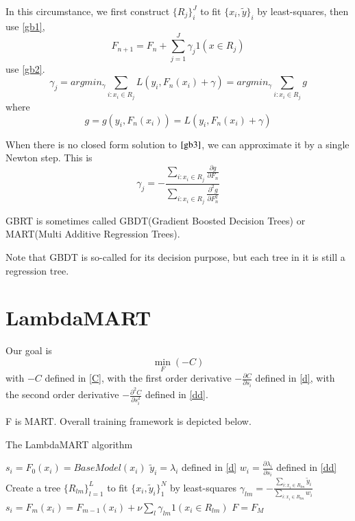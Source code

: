 \documentclass [11pt,a4paper]{article}
\begin{document}
In this circumstance, we first construct $\{R_j\}_i^J$ to fit $\{x_i, \widetilde{y}\}_i$ by least-squares,
then use \ref{gb1},
\begin{equation}
F_{n+1} = F_n + \sum_{j=1}^{J}\gamma_j 1(x \in R_j)
\end{equation}
use \ref{gb2}.
\begin{equation}
\label{gb3}
\gamma_j = argmin_{\gamma} \sum_{i:x_i \in R_j} L\left(y_i, F_n(x_i) + \gamma \right)
= argmin_{\gamma} \sum_{i:x_i \in R_j} g
\end{equation}
where
\begin{equation}
g = g(y_i, F_n(x_i)) = L\left(y_i, F_n(x_i) + \gamma \right)
\end{equation}


When there is no closed form solution to $\ref{gb3}$,
we can approximate it by a single Newton step.
This is
\begin{equation}
\gamma_j = - \frac
{\sum_{i:x_i \in R_j} \frac{\partial g}{\partial F_n}}
{\sum_{i:x_i \in R_j} \frac{\partial^2 g}{\partial F_n^2}}
\end{equation}


GBRT is sometimes called
GBDT(Gradient Boosted Decision Trees)
or
MART(Multi Additive Regression Trees).


Note that GBDT is so-called for its decision purpose, but each tree in it is still a regression tree.


\section{LambdaMART}
Our goal is
\begin{equation}
\min_{F} (-C)
\end{equation}
with $-C$ defined in \ref{C},
with the first order derivative $-\frac{\partial C}{\partial s_i}$ defined in \ref{d},
with the second order derivative $-\frac{\partial^2 C}{\partial s_i^2}$ defined in \ref{dd}.


F is MART. Overall training framework is depicted below.


\begin{algorithm}
\caption{The LambdaMART algorithm}
{
  $s_i = F_0(x_i) = BaseModel(x_i)$\;
}
{
  {
    $\widetilde{y}_i = \lambda_i$ defined in \ref{d}\;
    $w_i = \frac{\partial \lambda_i}{\partial s_i}$ defined in \ref{dd}\;
  }
  Create a tree $\{R_{lm}\}_{l=1}^L$ to fit $\{x_i, \widetilde{y}_i\}_1^N$ by least-squares\;
  {
    $\gamma_{lm} = - \frac
      {\sum_{i:x_i \in R_{lm}} \widetilde{y}_i}
      {\sum_{i:x_i \in R_{lm}} w_i}$\;
  }
  {
    $s_i = F_m(x_i) = F_{m-1}(x_i) + \nu \sum_l \gamma_{lm}1 (x_i \in R_{lm})$\;
  }
}
$F = F_M$\;
\end{algorithm}
\end{document}

